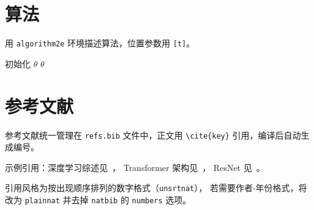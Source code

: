 \documentclass[10pt, a4paper]{article}
\begin{document}
\section{算法}

用 \texttt{algorithm2e} 环境描述算法，位置参数用 \verb|[t]|。

\begin{algorithm}[t]
\caption{算法示例}
\label{alg:example}
初始化 $\theta$\;
\Return $\theta$\;
\end{algorithm}

\section{参考文献}

参考文献统一管理在 \texttt{refs.bib} 文件中，正文用
\verb|\cite{key}| 引用，编译后自动生成编号。

示例引用：深度学习综述见~\cite{lecun2015deep}，
Transformer 架构见~\cite{vaswani2017attention}，
ResNet 见~\cite{he2016deep}。

引用风格为按出现顺序排列的数字格式（\texttt{unsrtnat}），
若需要作者-年份格式，将 \verb|| 改为
\texttt{plainnat} 并去掉 \texttt{natbib} 的 \texttt{numbers} 选项。


\end{document}
